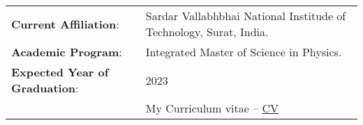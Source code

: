 \begin{tabular}{P{0.25\textwidth} P{0.7\textwidth}}
    \textbf{Current Affiliation}: & Sardar Vallabhbhai National Institude of Technology, Surat, India. \\
    \textbf{Academic Program}: & Integrated Master of Science in Physics. \\
    \textbf{Expected Year of Graduation}: & 2023 \\
    & My Curriculum vitae -- \href{https://github.com/devanshshukla99/devanshshukla99/blob/ff7d9d9bbd5e70345af307bd22dce285b77fc72a/cv/cv_devanshshukla99.pdf}{CV} \\
\end{tabular}
